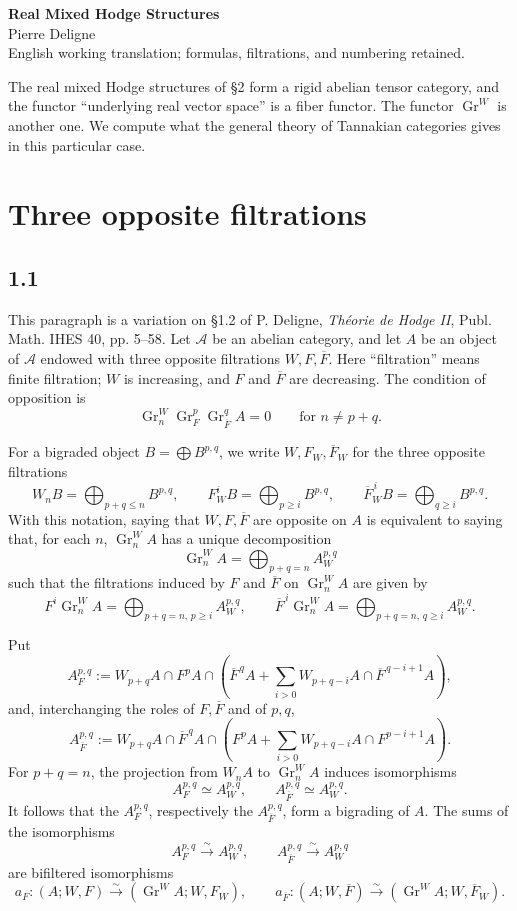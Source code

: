 \documentclass[11pt]{article}
\newcommand{\Gr}{\operatorname{Gr}}
\begin{document}
\begin{center}
 {\Large\bfseries Real Mixed Hodge Structures}\\[0.7em]
 {\large Pierre Deligne}\\[0.4em]
 {\small English working translation; formulas, filtrations, and numbering retained.}
\end{center}

The real mixed Hodge structures of \S2 form a rigid abelian tensor category, and the functor ``underlying real vector space'' is a fiber functor.  The functor \(\Gr^W\) is another one.  We compute what the general theory of Tannakian categories gives in this particular case.

\section{Three opposite filtrations}

\subsection*{1.1}
This paragraph is a variation on \S1.2 of P. Deligne, \emph{Théorie de Hodge II}, Publ. Math. IHES 40, pp. 5--58.  Let \(\mathcal A\) be an abelian category, and let \(A\) be an object of \(\mathcal A\) endowed with three opposite filtrations \(W,F,\overline F\).  Here ``filtration'' means finite filtration; \(W\) is increasing, and \(F\) and \(\overline F\) are decreasing.  The condition of opposition is
\[
   \Gr^W_n\Gr^p_F\Gr^q_{\overline F} A=0
   \qquad\text{for } n\ne p+q .
\]

For a bigraded object \(B=\bigoplus B^{p,q}\), we write \(W,F_W,\overline F_W\) for the three opposite filtrations
\[
 W_nB=\bigoplus_{p+q\le n}B^{p,q},\qquad
 F_W^iB=\bigoplus_{p\ge i}B^{p,q},\qquad
 \overline F_W^{\,i}B=\bigoplus_{q\ge i}B^{p,q}.
\]
With this notation, saying that \(W,F,\overline F\) are opposite on \(A\) is equivalent to saying that, for each \(n\), \(\Gr^W_nA\) has a unique decomposition
\[
   \Gr^W_nA=\bigoplus_{p+q=n} A_W^{p,q}
\]
such that the filtrations induced by \(F\) and \(\overline F\) on \(\Gr^W_nA\) are given by
\[
 F^i\Gr^W_nA=\bigoplus_{p+q=n,\,p\ge i}A_W^{p,q},\qquad
 \overline F^{\,i}\Gr^W_nA=\bigoplus_{p+q=n,\,q\ge i}A_W^{p,q}.
\]

Put
\[
 A_F^{p,q}:=W_{p+q}A\cap F^pA\cap
 \left(\overline F^{\,q}A+\sum_{i>0}W_{p+q-i}A\cap \overline F^{\,q-i+1}A\right),
\]
and, interchanging the roles of \(F,\overline F\) and of \(p,q\),
\[
 A_{\overline F}^{p,q}:=W_{p+q}A\cap \overline F^{\,q}A\cap
 \left(F^pA+\sum_{i>0}W_{p+q-i}A\cap F^{p-i+1}A\right).
\]
For \(p+q=n\), the projection from \(W_nA\) to \(\Gr^W_nA\) induces isomorphisms
\[
 A_F^{p,q}\simeq A_W^{p,q},\qquad
 A_{\overline F}^{p,q}\simeq A_W^{p,q}.
\]
It follows that the \(A_F^{p,q}\), respectively the \(A_{\overline F}^{p,q}\), form a bigrading of \(A\).  The sums of the isomorphisms
\[
 A_F^{p,q}\xrightarrow{\sim}A_W^{p,q},\qquad
 A_{\overline F}^{p,q}\xrightarrow{\sim}A_W^{p,q}
\]
are bifiltered isomorphisms
\[
 a_F:(A;W,F)\xrightarrow{\sim}(\Gr^WA;W,F_W),
 \qquad
 a_{\overline F}:(A;W,\overline F)\xrightarrow{\sim}(\Gr^WA;W,\overline F_W).
\]
\end{document}
